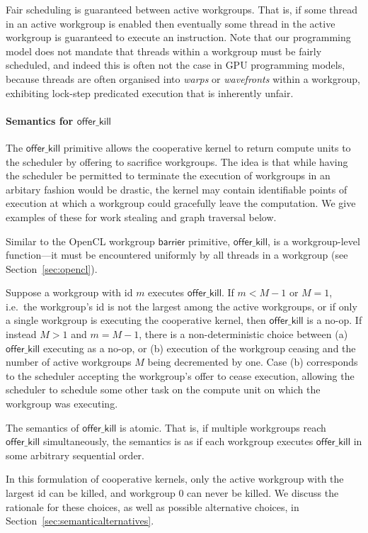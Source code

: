 \documentclass[numbers,nocopyrightspace,10pt]{sigplanconf}
\newcommand{\offerkill}{\mathsf{offer\_kill}}
\begin{document}
Fair scheduling is guaranteed between active workgroups.  That is, if
some thread in an active workgroup is enabled then eventually some
thread in the active workgroup is guaranteed to execute an
instruction.  Note that our programming model does not mandate that
threads within a workgroup must be fairly scheduled, and indeed this
is often not the case in GPU programming models, because threads are
often organised into \emph{warps} or \emph{wavefronts} within a
workgroup, exhibiting lock-step predicated execution that is
inherently unfair.

\paragraph{Semantics for $\offerkill$}

The $\offerkill$ primitive allows the cooperative kernel to return
compute units to the scheduler by offering to sacrifice workgroups.
The idea is that while having the scheduler be permitted to terminate
the execution of workgroups in an arbitary fashion would be drastic,
the kernel may contain identifiable points of execution at which a
workgroup could gracefully leave the computation.  We give examples of
these for work stealing and graph traversal below.

Similar to the OpenCL workgroup $\mathsf{barrier}$ primitive,
$\offerkill$, is a workgroup-level function---it must be encountered
uniformly by all threads in a workgroup (see
Section~\ref{sec:opencl}).

Suppose a workgroup with id $m$ executes $\offerkill$.  If $m < M-1$
or $M=1$, i.e.\ the workgroup's id is not the largest among the active
workgroups, or if only a single workgroup is executing the cooperative
kernel, then $\offerkill$ is a no-op.  If instead $M > 1$ and $m =
M-1$, there is a non-deterministic choice between (a) $\offerkill$
executing as a no-op, or (b) execution of the workgroup ceasing and
the number of active workgroups $M$ being decremented by one.  Case
(b) corresponds to the scheduler accepting the workgroup's offer to
cease execution, allowing the scheduler to schedule some other task on
the compute unit on which the workgroup was executing.

The semantics of $\offerkill$ is atomic.  That is, if multiple
workgroups reach $\offerkill$ simultaneously, the semantics is as if
each workgroup executes $\offerkill$ in some arbitrary sequential
order.

In this formulation of cooperative kernels, only the active workgroup
with the largest id can be killed, and workgroup 0 can never be
killed.  We discuss the rationale for these choices, as well as
possible alternative choices, in
Section~\ref{sec:semanticalternatives}.
\end{document}
